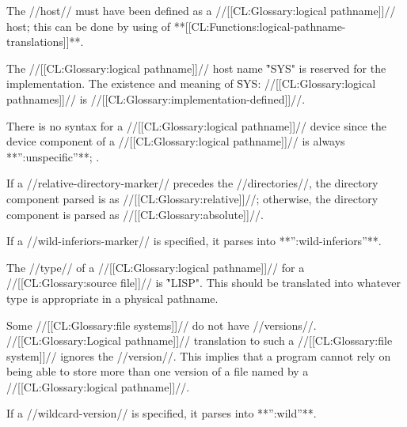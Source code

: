 
The //host// must have been defined as a //[[CL:Glossary:logical pathname]]// host; this can be done by using  of **[[CL:Functions:logical-pathname-translations]]**.

The //[[CL:Glossary:logical pathname]]// host name \f{"SYS"} is reserved for the implementation. The existence and meaning of \f{SYS:} //[[CL:Glossary:logical pathnames]]//  is //[[CL:Glossary:implementation-defined]]//.
  \endsubsubsubsection%

  There is no syntax for a //[[CL:Glossary:logical pathname]]// device since the device component of a //[[CL:Glossary:logical pathname]]// is always **'':unspecific''**; \seesection\LogicalPathCompUnspecific.

\endsubsubsubsection%


If a //relative-directory-marker// precedes the //directories//, the directory component parsed is as //[[CL:Glossary:relative]]//; otherwise, the directory component is parsed as //[[CL:Glossary:absolute]]//.

If a //wild-inferiors-marker// is specified, it parses into **'':wild-inferiors''**.
  \endsubsubsubsection%


The //type// of a //[[CL:Glossary:logical pathname]]// for a //[[CL:Glossary:source file]]// is \f{"LISP"}.   This should be translated into whatever type is  appropriate in a physical pathname.
  \endsubsubsubsection%


Some //[[CL:Glossary:file systems]]// do not have //versions//.  //[[CL:Glossary:Logical pathname]]// translation to such a //[[CL:Glossary:file system]]// ignores the //version//. This implies that a program cannot rely on being able to store more than one version of a file named by a //[[CL:Glossary:logical pathname]]//.

If a //wildcard-version// is specified, it parses into **'':wild''**.


